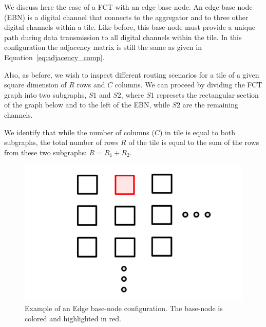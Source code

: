We discuss here the case of a FCT with an edge base node.
An edge base node (EBN) is a digital channel that connects to the aggregator and to three other digital channels within a tile.
Like before, this base-node must provide a unique path during data transmission to all digital channels within the tile.
In this configuration the adjacency matrix is still the same as given in Equation~\ref{eq:adjacency_comp}.

Also, as before, we wish to inspect different routing scenarios for a tile of a given square dimension of $R$ rows and $C$ columns.
We can proceed by dividing the FCT graph into two subgraphs, $S1$ and $S2$, where $S1$ represets the rectangular section of the graph below and to the left of the EBN, while $S2$ are the remaining channels.

We identify that while the number of columns ($C$) in tile is equal to both subgraphs, the total number of rows $R$ of the tile is equal to the sum of the rows from these two subgraphs: $R = R_{1} + R_{2}$.

\begin{figure}[]
\centering
\includegraphics[width=\textwidth]{images/EBN.pdf}
\caption{Example of an Edge base-node configuration. The base-node is colored and highlighted in red.}
\end{figure}~\label{fig:ebn}

